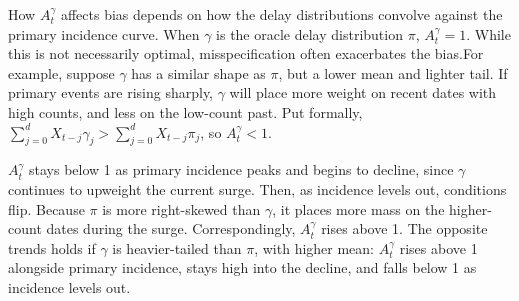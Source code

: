 \documentclass{article}
\newcommand{\djmcomment}[1]{{\color{teal}[DJM: #1]}}
\newcommand{\jmgcomment}[1]{{\color{cyan}[JMG: #1]}}
\begin{document}




How $A_t^\gamma$ affects bias depends on how the delay distributions convolve against the primary incidence curve. 
When $\gamma$ is the oracle delay distribution $\pi$, $A_t^\gamma=1$. While this is not necessarily optimal, misspecification often exacerbates the bias.For example, suppose $\gamma$ has a similar shape as $\pi$, but a lower mean and lighter tail.
If primary events are rising sharply, $\gamma$ will place more weight on recent dates with high counts, and less on the low-count past. Put formally, $\sum_{j=0}^d X_{t-j}\gamma_j > \sum_{j=0}^d X_{t-j}\pi_j$, so $A_t^\gamma < 1$. 

$A_t^\gamma$ stays below 1 as primary incidence peaks and begins to decline, since $\gamma$ continues to upweight the current surge. 
Then, as incidence levels out, conditions flip. 
Because $\pi$ is more right-skewed than $\gamma$, it places more mass on the higher-count dates during the surge.
Correspondingly, $A_t^\gamma$ rises above 1. The opposite trends holds if $\gamma$ is heavier-tailed than $\pi$, with higher mean: $A_t^\gamma$ rises above 1 alongside primary incidence, stays high into the decline, and falls below 1 as incidence levels out. 
\end{document}
